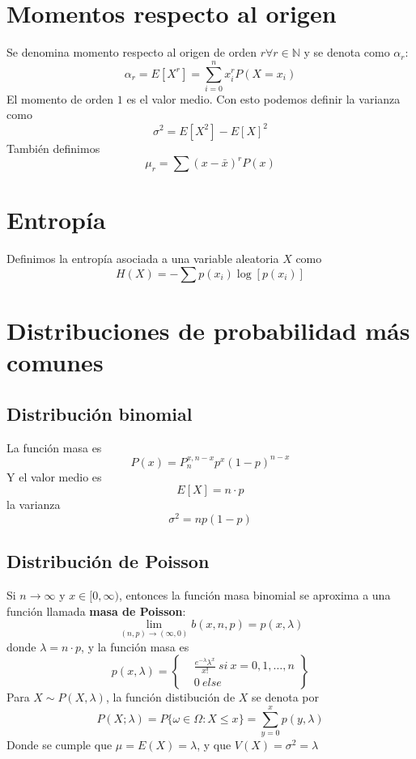 \documentclass{./Probabilidad.tex}
\begin{document}
\section{Momentos respecto al origen}
Se denomina momento respecto al origen de orden $r \forall r \in \mathbb{N}$ y se denota como $\alpha_{r}$:
$$
\alpha_{r}=E[X^{r}] = \sum_{i=0}^{n} x_{i}^{r}P(X=x_{i})
$$
El momento de orden $1$ es el valor medio. Con esto podemos definir la varianza como
$$
\sigma^{2}=E[X^{2}]-E[X]^{2}
$$
También definimos
$$
\mu_{r} = \sum(x-\bar{x})^rP(x)
$$
\section{Entropía}
Definimos la entropía asociada a una variable aleatoria $X$ como
$$
H(X)= -\sum p(x_{i}) \log[p(x_{i})]
$$
\section{Distribuciones de probabilidad más comunes}
\subsection{Distribución binomial}
La función masa es
\[
	P(x) = P_{n}^{x,n-x}p^{x}(1-p)^{n-x}
\]
Y el valor medio es
\[
	E[X] = n\cdot p
\]
la varianza
\[
	\sigma ^{2}= np(1-p)
\]
\subsection{Distribución de Poisson}
Si $n \to \infty$ y $x \in [0, \infty)$, entonces la función masa binomial se aproxima a una función llamada \textbf{masa de Poisson}:
\[
	\lim_{(n,p) \to (\infty,0)} b(x,n,p)=p(x,\lambda) 
\]
donde $\lambda = n\cdot p$, y la función masa es
\[
	p(x,\lambda) = \left\{
		\begin{matrix}
			&\frac{e^{-\lambda} \lambda^{x}}{x!}~si~x=0,1,\dots ,n\\
			&0~else
	\end{matrix}\right\}
\]
Para $X\sim P(X,\lambda)$, la función distibución de $X$ se denota por
\[
	P(X;\lambda)=P \{ \omega \in \Omega : X \leq x\} = \sum_{y=0}^{x} p(y,\lambda)
\]
Donde se cumple que $\mu = E(X) = \lambda$, y que $V(X) = \sigma ^{2} = \lambda$ 
\end{document}
